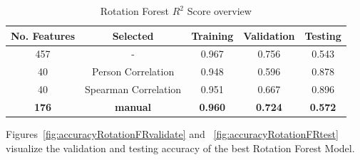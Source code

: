 \documentclass[11pt]{article}
\begin{document}
\begin{table} [h!]
\centering
\resizebox{\linewidth}{!} {
 \begin{tabular}{ | c | c | c | c | c | }
\hline
\textbf{No.  Features} & \textbf{Selected} & \textbf{Training} & \textbf{Validation} & \textbf{Testing} \\ [0.5 ex]
\hline \hline
457 & - & 0.967 & 0.756 & 0.543\\
40 & Person Correlation & 0.948 & 0.596 & 0.878\\
40 & Spearman Correlation & 0.951 & 0.667 &0.896 \\
\textbf{176} & \textbf{manual} & \textbf{0.960} & \textbf{0.724} & \textbf{0.572} \\ [1ex]
\hline
\end{tabular}
}
\caption{Rotation Forest $R^2$ Score overview}
\label {table:4}
\end{table}

Figures~\ref{fig:accuracyRotationFRvalidate} and ~\ref{fig:accuracyRotationFRtest} visualize the validation and testing accuracy of the best Rotation Forest Model.
\end{document}
